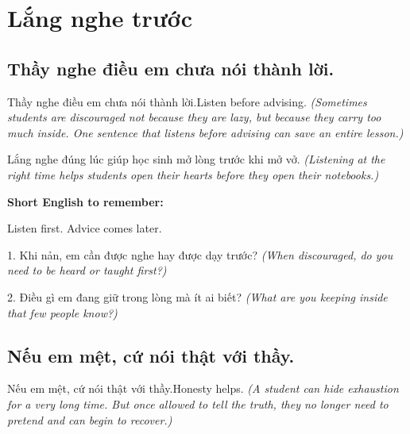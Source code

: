 \chapter{Lắng nghe trước}


\section{Thầy nghe điều em chưa nói thành lời.}
\begin{truyen}{Thầy nghe điều em chưa nói thành lời.}{Listen before advising.}
\textit{(Sometimes students are discouraged not because they are lazy, but because they carry too much inside. One sentence that listens before advising can save an entire lesson.)}
\end{truyen}

\begin{baihoc}
Lắng nghe đúng lúc giúp học sinh mở lòng trước khi mở vở.
\textit{(Listening at the right time helps students open their hearts before they open their notebooks.)}
\end{baihoc}

\begin{ghinhoanh}
\textbf{Short English to remember:}

Listen first. Advice comes later.

\end{ghinhoanh}

\begin{tuhocnhanh}
1. Khi nản, em cần được nghe hay được dạy trước? \textit{(When discouraged, do you need to be heard or taught first?)}

2. Điều gì em đang giữ trong lòng mà ít ai biết? \textit{(What are you keeping inside that few people know?)}
\end{tuhocnhanh}
\ngancach


\section{Nếu em mệt, cứ nói thật với thầy.}
\begin{truyen}{Nếu em mệt, cứ nói thật với thầy.}{Honesty helps.}
\textit{(A student can hide exhaustion for a very long time. But once allowed to tell the truth, they no longer need to pretend and can begin to recover.)}
\end{truyen}

